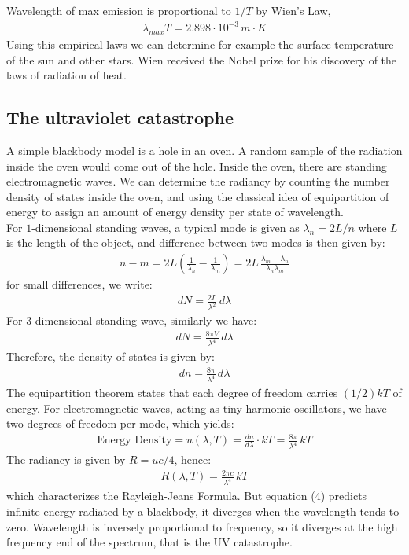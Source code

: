 \documentclass[11pt]{article}
\theoremstyle{break}
\theoremstyle{break}
\begin{document}
Wavelength of max emission is proportional to $1/T$ by Wien's Law,
\begin{align*}
\lambda_{max} T = 2.898\cdot 10^{-3}\, m\cdot K
\end{align*}
Using this empirical laws we can determine for example the surface temperature of the sun and other stars. Wien received the Nobel prize for his discovery of the laws of radiation of heat.\\

\subsection{The ultraviolet catastrophe}
A simple blackbody model is a hole in an oven. A random sample of the radiation inside the oven would come out of the hole. Inside the oven, there are standing electromagnetic waves. We can determine the radiancy by counting the number density of states inside the oven, and using the classical idea of equipartition of energy to assign an amount of energy density per state of wavelength. \\

For $1$-dimensional standing waves, a typical mode is given as $\lambda_n = 2L/n$ where $L$ is the length of the object, and difference between two modes is then given by:
\begin{align}
n - m = 2L \left( \frac{1}{\lambda_n} - \frac{1}{\lambda_m} \right) = 2L \, \frac{\lambda_m - \lambda_n}{\lambda_n \lambda_m} \tag{1-D wave}
\end{align}
for small differences, we write:
\begin{align}
dN = \frac{2L}{\lambda^2}\, d\lambda \tag{1-D wave}
\end{align}
For $3$-dimensional standing wave, similarly we have:
\begin{align}
dN = \frac{8\pi V}{\lambda^4}\,d\lambda
\end{align}
Therefore, the density of states is given by:
\begin{align*}
dn = \frac{8\pi}{\lambda^4}\, d\lambda
\end{align*}
The equipartition theorem states that each degree of freedom carries $(1/2)kT$ of energy. For electromagnetic waves, acting as tiny harmonic oscillators, we have two degrees of freedom per mode, which yields:
\begin{align}
\text{Energy Density} = u(\lambda, T) = \frac{dn}{d\lambda}\cdot kT = \frac{8\pi}{\lambda^4}\, kT
\end{align}
The radiancy is given by $R = uc/4$, hence:
\begin{align}
R(\lambda, T) = \frac{2\pi c}{\lambda^4}\, kT
\end{align}
which characterizes the Rayleigh-Jeans Formula. But equation (4) predicts infinite energy radiated by a blackbody, it diverges when the wavelength tends to zero. Wavelength is inversely proportional to frequency, so it diverges at the high frequency end of the spectrum, that is the UV catastrophe. \\
\end{document}

